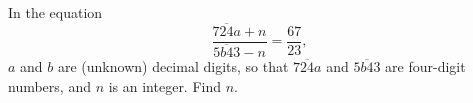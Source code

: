 In the equation
\[
\dfrac{\overline{724a}+n}{\overline{5b43}-n}=\dfrac{67}{23},
\]
$a$ and $b$ are (unknown) decimal digits, so that $\overline{724a}$ and $\overline{5b43}$ are four-digit numbers, and $n$ is an integer. Find $n$.
